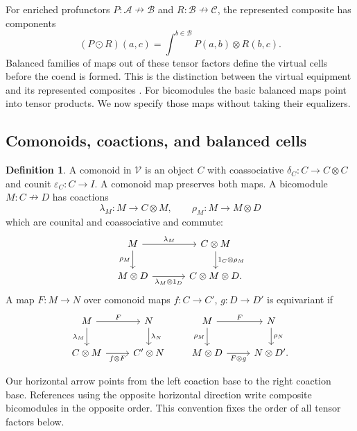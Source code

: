 \documentclass[11pt,reqno]{amsart}
\theoremstyle{plain}
\theoremstyle{definition}
\newtheorem{definition}[theorem]{Definition}
\theoremstyle{remark}
\numberwithin{equation}{section}
\newcommand{\V}{\mathcal V}
\newcommand{\harr}{\mathrel{\nrightarrow}}
\newcommand{\eps}{\varepsilon}
\newcommand{\wh}{\mathbin{\odot}}
\begin{document}
For enriched profunctors $P:\mathcal A\harr\mathcal B$ and
$R:\mathcal B\harr\mathcal C$, the represented composite has
components
\[
 (P\wh R)(a,c)=\int^{b\in\mathcal B}P(a,b)\otimes R(b,c).
\]
Balanced families of maps out of these tensor factors define the virtual
cells before the coend is formed. This is the distinction between the
virtual equipment and its represented composites
\cite[Examples 5.6 and 7.7]{CruttwellShulman2010}.
For bicomodules the basic balanced maps point into tensor products.
We now specify those maps without taking their equalizers.

\subsection{Comonoids, coactions, and balanced cells}

\begin{definition}
A comonoid in $\V$ is an object $C$ with coassociative
$\delta_C:C\to C\otimes C$ and counit $\eps_C:C\to I$.
A comonoid map preserves both maps. A bicomodule $M:C\harr D$ has
coactions
\[
 \lambda_M:M\to C\otimes M,\qquad
 \rho_M:M\to M\otimes D
\]
which are counital and coassociative and commute:
\begin{equation}\label{eq:bicomodcommute}
\begin{tikzcd}[column sep=3.4em]
M \arrow[r,"\lambda_M"] \arrow[d,"\rho_M"'] &
C\otimes M \arrow[d,"1_C\otimes\rho_M"]\\
M\otimes D \arrow[r,"\lambda_M\otimes1_D"'] & C\otimes M\otimes D.
\end{tikzcd}
\end{equation}
A map $F:M\to N$ over comonoid maps $f:C\to C'$, $g:D\to D'$
is equivariant if
\begin{equation}\label{eq:equivariant}
\begin{tikzcd}[column sep=2.4em]
M \arrow[r,"F"] \arrow[d,"\lambda_M"'] & N \arrow[d,"\lambda_N"]\\
C\otimes M \arrow[r,"f\otimes F"'] & C'\otimes N
\end{tikzcd}
\qquad
\begin{tikzcd}[column sep=2.4em]
M \arrow[r,"F"] \arrow[d,"\rho_M"'] & N \arrow[d,"\rho_N"]\\
M\otimes D \arrow[r,"F\otimes g"'] & N\otimes D'.
\end{tikzcd}
\end{equation}
\end{definition}

Our horizontal arrow points from the left coaction base to the right
coaction base. References using the opposite horizontal direction write
composite bicomodules in the opposite order. This convention fixes the
order of all tensor factors below.
\end{document}
